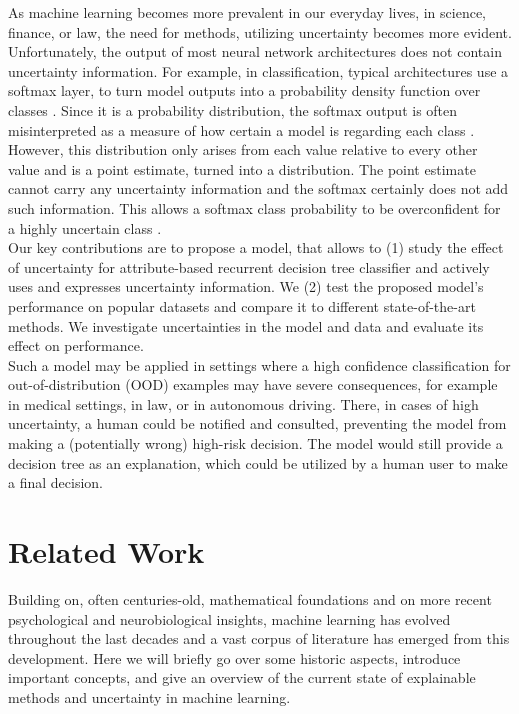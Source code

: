 \documentclass[a4paper,cleardoubleempty,BCOR1cm, 11pt]{report}
\begin{document}
As machine learning becomes more prevalent in our everyday lives, in science, finance, or law, the need for methods, utilizing uncertainty becomes more evident.\\
Unfortunately, the output of most neural network architectures does not contain uncertainty information. For example, in classification, typical architectures use a softmax layer, to turn model outputs into a probability density function over classes \cite{nwankpa2018activation}. Since it is a probability distribution, the softmax output is often misinterpreted as a measure of how certain a model is regarding each class \cite{sensoy2018evidential}. However, this distribution only arises from each value relative to every other value and is a point estimate, turned into a distribution. The point estimate cannot carry any uncertainty information and the softmax certainly does not add such information. This allows a softmax class probability to be overconfident for a highly uncertain class \cite{gal2016dropout, nguyen2015deep, hein2019relu}.\\
Our key contributions are to propose a model, that allows to (1) study the effect of uncertainty for attribute-based recurrent decision tree classifier and actively uses and expresses uncertainty information. We (2) test the proposed model's performance on popular datasets and compare it to different state-of-the-art methods. We investigate uncertainties in the model and data and evaluate its effect on performance. \\
Such a model may be applied in settings where a high confidence classification for out-of-distribution (OOD) examples may have severe consequences, for example in medical settings, in law, or in autonomous driving. There, in cases of high uncertainty, a human could be notified and consulted, preventing the model from making a (potentially wrong) high-risk decision. The model would still provide a decision tree as an explanation, which could be utilized by a human user to make a final decision.




\chapter{Related Work}
Building on, often centuries-old, mathematical foundations and on more recent psychological and neurobiological insights, machine learning has evolved throughout the last decades and a vast corpus of literature has emerged from this development. Here we will briefly go over some historic aspects, introduce important concepts, and give an overview of the current state of explainable methods and uncertainty in machine learning. 
\end{document}
